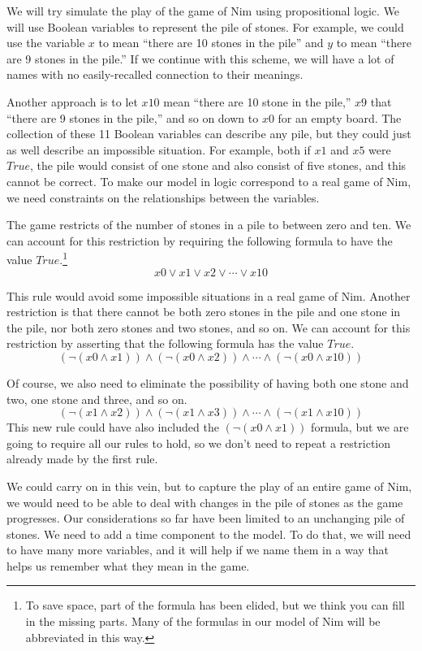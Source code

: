 {We will try simulate the play of the game of Nim using propositional logic.
We will use Boolean variables to represent the pile of stones.
For example, we could use the variable $x$ to mean ``there are 10 stones in the pile''
and $y$ to mean ``there are 9 stones in the pile.''
If we continue with this scheme, we will have a lot of names with
no easily-recalled connection to their meanings.

Another approach is to let $x10$ mean ``there are 10 stone in the pile,''
$x9$ that ``there are 9 stones in the pile,'' and so on
down to $x0$ for an empty board.
The collection of these 11 Boolean variables can describe any pile,
but they could just as well describe an impossible situation.
For example, both if $x1$ and $x5$ were $True$,
the pile would consist of one stone and also consist of five stones,
and this cannot be correct.
To make our model in logic correspond to a real game of Nim,
we need constraints on the relationships between the variables.

The game restricts of the number
of stones in a pile to between zero and ten.
We can account for this restriction by requiring
the following formula to have the value $True$.\footnote{To
save space, part of the formula has
been elided, but we think you can fill in the missing parts.
Many of the formulas in our model of Nim will be abbreviated in this way.}
$$x0 \vee x1 \vee x2 \vee \cdots \vee x10$$

This rule would avoid some impossible situations in a real game of Nim.
Another restriction is that there cannot be both zero stones in the pile
and one stone in the pile, nor both zero stones and two stones, and so on.
We can account for this restriction by asserting that the following formula
has the value $True$.
$$(\neg(x0 \wedge x1)) \wedge (\neg(x0 \wedge x2)) \wedge \cdots \wedge (\neg(x0 \wedge x10))$$

Of course,
we also need to eliminate the possibility of having
both one stone and two, one stone and three, and so on.
$$(\neg(x1 \wedge x2)) \wedge (\neg(x1 \wedge x3)) \wedge \cdots \wedge (\neg(x1 \wedge x10))$$
This new rule could have also included the $(\neg(x0 \wedge x1))$ formula,
but we are going to require all our rules to hold, so we don't need to
repeat a restriction already made by the first rule.

We could carry on in this vein,
but to capture the play of an entire game of Nim,
we would need to be able to deal with changes in the pile of stones
as the game progresses.
Our considerations so far have been limited to an unchanging pile of stones.
We need to add a time component to the model.
To do that, we will need to have many more variables,
and it will help if we name them in a way that helps
us remember what they mean in the game.

}
